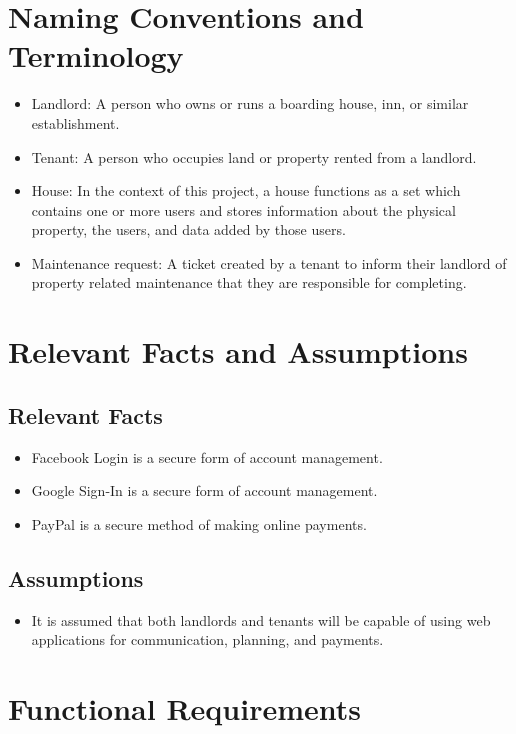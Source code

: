 \documentclass[12pt]{article}
\begin{document}
\section{Naming Conventions and Terminology}
    \begin{itemize}
    \item Landlord: A person who owns or runs a boarding house, inn, or similar
      establishment.
    \item Tenant: A person who occupies land or property rented from a landlord.
    \item House: In the context of this project, a house functions as a set
      which contains one or more users and stores information about the
      physical property, the users, and data added by those users.
    \item Maintenance request: A ticket created by a tenant to inform their
      landlord of property related maintenance that they are responsible for
      completing.
    \end{itemize}

\section{Relevant Facts and Assumptions} 
\subsection{Relevant Facts}
  \begin{itemize}
    \item Facebook Login is a secure form of account management.
    \item Google Sign-In is a secure form of account management.
    \item PayPal is a secure method of making online payments. 
  \end{itemize}
\subsection{Assumptions}
  \begin{itemize}
  \item  It is assumed that both landlords and tenants will be capable of using
    web applications for communication, planning, and payments.
  \end{itemize} 

\section{Functional Requirements} 
\end{document}
